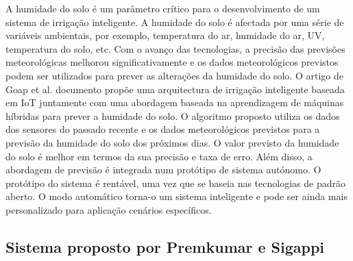 \documentclass[conference]{IEEEtran}
\begin{document}
A humidade do solo é um parâmetro crítico para o desenvolvimento de um 
sistema de irrigação inteligente. A humidade do solo é afectada por uma 
série de variáveis ambientais, por exemplo, temperatura do ar, 
humidade do ar, UV, temperatura do solo, etc. Com o avanço das tecnologias, 
a precisão das previsões meteorológicas melhorou significativamente e 
os dados meteorológicos previstos podem ser utilizados para prever as 
alterações da humidade do solo. O artigo de Goap et al. documento propõe uma arquitectura 
de irrigação inteligente baseada em IoT juntamente com uma abordagem 
baseada na aprendizagem de máquinas híbridas para prever a humidade do solo. 
O algoritmo proposto utiliza os dados dos sensores do passado recente e 
os dados meteorológicos previstos para a previsão da humidade do solo 
dos próximos dias. O valor previsto da humidade do solo é melhor em 
termos da sua precisão e taxa de erro. Além disso, a abordagem de 
previsão é integrada num protótipo de sistema autónomo. O protótipo 
do sistema é rentável, uma vez que se baseia nas tecnologias de padrão aberto. 
O modo automático torna-o um sistema inteligente e pode ser ainda 
mais personalizado para aplicação cenários específicos. \cite{goap2018an}

\subsection{Sistema proposto por Premkumar e Sigappi}
\end{document}
